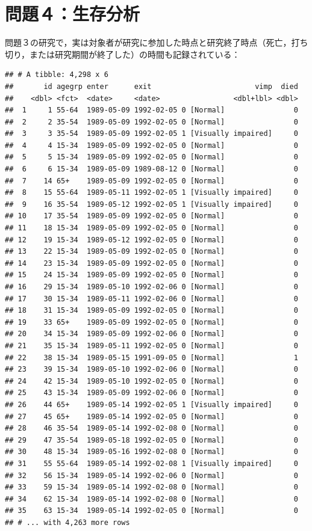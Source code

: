 \documentclass[11pt,]{problemset}
\begin{document}
\newpage
\vfill

\section{問題４：生存分析}

問題３の研究で，実は対象者が研究に参加した時点と研究終了時点（死亡，打ち切り，または研究期間が終了した）の時間も記録されている：

\begin{verbatim}
## # A tibble: 4,298 x 6
##       id agegrp enter      exit                        vimp  died
##    <dbl> <fct>  <date>     <date>                 <dbl+lbl> <dbl>
##  1     1 55-64  1989-05-09 1992-02-05 0 [Normal]                0
##  2     2 35-54  1989-05-09 1992-02-05 0 [Normal]                0
##  3     3 35-54  1989-05-09 1992-02-05 1 [Visually impaired]     0
##  4     4 15-34  1989-05-09 1992-02-05 0 [Normal]                0
##  5     5 15-34  1989-05-09 1992-02-05 0 [Normal]                0
##  6     6 15-34  1989-05-09 1989-08-12 0 [Normal]                0
##  7    14 65+    1989-05-09 1992-02-05 0 [Normal]                0
##  8    15 55-64  1989-05-11 1992-02-05 1 [Visually impaired]     0
##  9    16 35-54  1989-05-12 1992-02-05 1 [Visually impaired]     0
## 10    17 35-54  1989-05-09 1992-02-05 0 [Normal]                0
## 11    18 15-34  1989-05-09 1992-02-05 0 [Normal]                0
## 12    19 15-34  1989-05-12 1992-02-05 0 [Normal]                0
## 13    22 15-34  1989-05-09 1992-02-05 0 [Normal]                0
## 14    23 15-34  1989-05-09 1992-02-05 0 [Normal]                0
## 15    24 15-34  1989-05-09 1992-02-05 0 [Normal]                0
## 16    29 15-34  1989-05-10 1992-02-06 0 [Normal]                0
## 17    30 15-34  1989-05-11 1992-02-06 0 [Normal]                0
## 18    31 15-34  1989-05-09 1992-02-05 0 [Normal]                0
## 19    33 65+    1989-05-09 1992-02-05 0 [Normal]                0
## 20    34 15-34  1989-05-09 1992-02-06 0 [Normal]                0
## 21    35 15-34  1989-05-11 1992-02-05 0 [Normal]                0
## 22    38 15-34  1989-05-15 1991-09-05 0 [Normal]                1
## 23    39 15-34  1989-05-10 1992-02-06 0 [Normal]                0
## 24    42 15-34  1989-05-10 1992-02-05 0 [Normal]                0
## 25    43 15-34  1989-05-09 1992-02-06 0 [Normal]                0
## 26    44 65+    1989-05-14 1992-02-05 1 [Visually impaired]     0
## 27    45 65+    1989-05-14 1992-02-05 0 [Normal]                0
## 28    46 35-54  1989-05-14 1992-02-08 0 [Normal]                0
## 29    47 35-54  1989-05-18 1992-02-05 0 [Normal]                0
## 30    48 15-34  1989-05-16 1992-02-08 0 [Normal]                0
## 31    55 55-64  1989-05-14 1992-02-08 1 [Visually impaired]     0
## 32    56 15-34  1989-05-14 1992-02-06 0 [Normal]                0
## 33    59 15-34  1989-05-14 1992-02-08 0 [Normal]                0
## 34    62 15-34  1989-05-14 1992-02-08 0 [Normal]                0
## 35    63 15-34  1989-05-14 1992-02-05 0 [Normal]                0
## # ... with 4,263 more rows
\end{verbatim}
\end{document}
